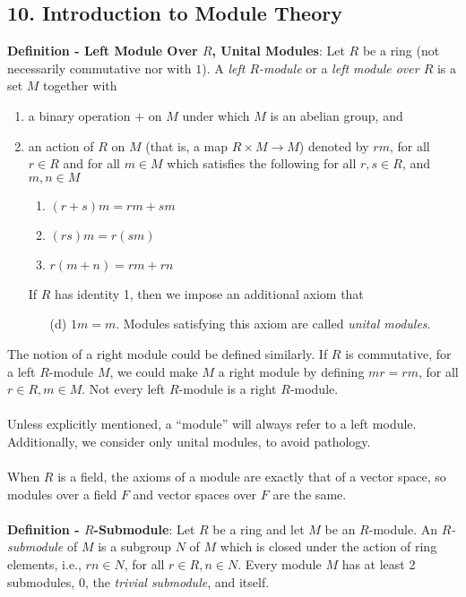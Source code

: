 \documentclass{article}
\begin{document}
\subsection*{10. Introduction to Module Theory}
\textbf{Definition - Left Module Over $R$, Unital Modules}: Let $R$ be a ring (not necessarily commutative nor with $1$). A \textit{left $R$-module} or a \textit{left module over $R$} is a set $M$ together with \begin{enumerate}
    \item a binary operation $+$ on $M$ under which $M$ is an abelian group, and
    \item an action of $R$ on $M$ (that is, a map $R \times M \rightarrow M$) denoted by $rm$, for all $r \in R$ and for all $m \in M$ which satisfies the following for all $r, s \in R$, and $m, n \in M$ \begin{enumerate}
        \item $(r + s)m = rm + sm$
        \item $(rs)m = r(sm)$
        \item $r(m + n) = rm + rn$
    \end{enumerate} If $R$ has identity 1, then we impose an additional axiom that \begin{enumerate}
        \item[(d)] $1m = m$. Modules satisfying this axiom are called \textit{unital modules}.
    \end{enumerate}
\end{enumerate} The notion of a right module could be defined similarly. If $R$ is commutative, for a left $R$-module $M$, we could make $M$ a right module by defining $mr = rm$, for all $r \in R, m \in M$. Not every left $R$-module is a right $R$-module. \\ \\
Unless explicitly mentioned, a ``module'' will always refer to a left module. Additionally, we consider only unital modules, to avoid pathology. \\ \\
When $R$ is a field, the axioms of a module are exactly that of a vector space, so modules over a field $F$ and vector spaces over $F$ are the same. \\ \\
\textbf{Definition - $R$-Submodule}: Let $R$ be a ring and let $M$ be an $R$-module. An \textit{$R$-submodule} of $M$ is a subgroup $N$ of $M$ which is closed under the action of ring elements, i.e., $rn \in N$, for all $r \in R, n \in N$. Every module $M$ has at least 2 submodules, 0, the \textit{trivial submodule}, and itself. \\ \\
\end{document}
